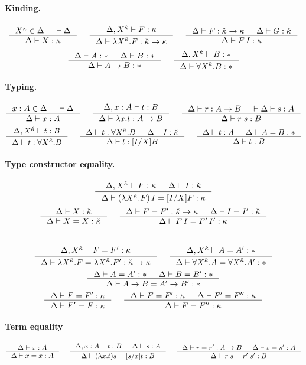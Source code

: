 \paragraph{Kinding.}
\[ \inference{X^\kappa\in\Delta & |- \Delta}
             {\Delta |- X : \kappa}
 ~~~~
   \inference{\Delta,X^\ka |- F : \kappa}
             {\Delta |- \lambda X^\ka.F : \ka\to\kappa}
 ~~~~
   \inference{\Delta |- F : \ka\to\kappa & \Delta |- G : \ka}
             {\Delta |- F\,I : \kappa}
\]
\[ \inference{\Delta |- A : * & \Delta |- B : *}{\Delta |- A \to B : * }
 ~~~~
   \inference{\Delta, X^\ka |- B : *}{\Delta |- \forall X^\ka . B : *}
\]

\paragraph{Typing.}
\[ \inference{x:A \in \Delta & |- \Delta}{\Delta |- x:A}
 ~~~~
   \inference{\Delta, x:A |- t : B}{\Delta |- \lambda x.t : A\to B}
 ~~~~
   \inference{\Delta |- r : A\to B & |- \Delta |- s : A}{\Delta |- r\;s : B}
\]
\[ \inference{\Delta, X^\ka |- t : B}{\Delta |- t : \forall X^\ka.B}
 ~~~~
   \inference{\Delta |- t : \forall X^\ka.B & \Delta |- I:\ka}
             {\Delta |- t : [I/X]B}
 ~~~~
   \inference{\Delta |- t :A & \Delta |- A = B : *}{\Delta |- t : B}
\]

\paragraph{Type constructor equality.}
\[ \inference{\Delta,X^\ka |- F:\kappa & \Delta |- I:\ka}
             {\Delta |- (\lambda X^\ka.F)\,I = [I/X]F:\kappa}
\]
\[ \inference{\Delta |- X:\ka }{\Delta |- X=X:\ka}
 ~~~~
   \inference{\Delta |- F=F':\ka\to\kappa & \Delta |- I=I':\ka}
             {\Delta |- F\,I = F'\,I' : \kappa}
\]
 ~~~~
\[ \inference{\Delta,X^\ka |- F=F' : \kappa}
             {\Delta |- \lambda X^\ka.F=\lambda X^\ka.F' : \ka\to\kappa}
 ~~~~
   \inference{\Delta,X^\ka |- A=A':*}
             {\Delta |- \forall X^\ka.A=\forall X^\ka.A':*}
\]
\[ \inference{\Delta |- A=A':* & \Delta |- B=B':*}{\Delta |- A\to B=A'\to B':*}
\]
\[ \inference{\Delta |- F = F' : \kappa}{\Delta |- F' = F : \kappa}
 ~~~~
   \inference{\Delta |- F = F' : \kappa & \Delta |- F' = F'' : \kappa}
             {\Delta |- F = F'' : \kappa}
\]

\paragraph{Term equality}
\[ \inference{\Delta |- x:A}{\Delta |- x=x:A}
 ~~~~
   \inference{\Delta,x:A |- t:B & \Delta |- s:A}
             {\Delta |- (\lambda x.t)s=[s/x]t : B}
 ~~~~
   \inference{\Delta |- r=r':A\to B & \Delta |- s=s':A}{\Delta |- r\;s=r'\;s':B}
\]








